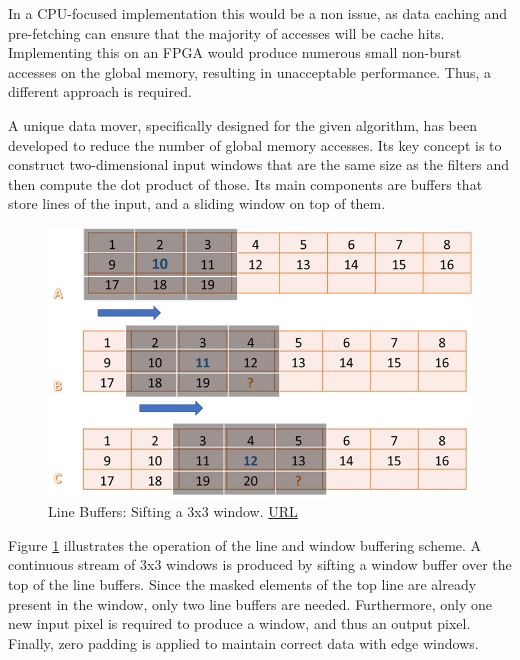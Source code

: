 In a CPU-focused implementation this would be a non issue, as data caching and pre-fetching can ensure that the majority of accesses will be cache hits. Implementing this on an FPGA would produce numerous small non-burst accesses on the global memory, resulting in unacceptable performance. Thus, a different approach is required.

A unique data mover, specifically designed for the given algorithm, has been developed to reduce the number of global memory accesses. Its key concept is to construct two-dimensional input windows that are the same size as the filters and then compute the dot product of those. Its main components are buffers that store lines of the input, and a sliding window on top of them.

\begin{figure}[H]
    \centering
        \includegraphics[width=1\textwidth]{Images/diagrams/line_buf_conv.jpg}
        \decoRule
        \caption[Line Buffers, Convolution]{Line Buffers: Sifting a 3x3 window. \href{https://github.com/Xilinx/Vitis-Tutorials/blob/2022.1/Hardware_Acceleration/Design_Tutorials/01-convolution-tutorial/lab2_conv_filter_kernel_design.md}{URL} }
        \label{fig: Line Buffers Convolution}
\end{figure}

Figure \ref{fig: Line Buffers Convolution} illustrates the operation of the line and window buffering scheme. A continuous stream of 3x3 windows is produced by sifting a window buffer over the top of the line buffers. Since the masked elements of the top line are already present in the window, only two line buffers are needed. Furthermore, only one new input pixel is required to produce a window, and thus an output pixel. Finally, zero padding is applied to maintain correct data with edge windows.

